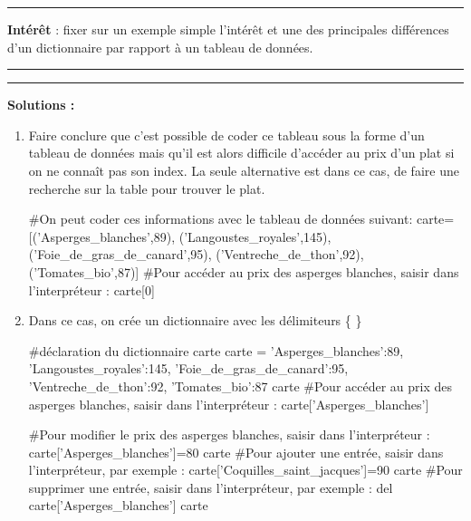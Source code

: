\documentclass[12pt,french]{article}
\begin{document}
\hrule
\vskip0.1cm
\textbf{Intérêt} : fixer sur un exemple simple l'intérêt et une des principales différences d'un dictionnaire par rapport à un tableau de données.\\
\hrule
\vskip0.1cm 
\hrule
\textbf{Solutions :}\\
\begin{enumerate}
	\item Faire conclure que c'est possible de coder ce tableau sous la forme d'un tableau de données mais qu'il est alors difficile d'accéder au prix d'un plat si on ne connaît pas son index. La seule alternative est dans ce cas, de faire une recherche sur la table pour trouver le plat.
\begin{tcolorbox}[enhanced,attach boxed title to top center={yshift=-3mm,yshifttext=-1mm},
	colback=green!5!white,colframe=green!75!black,colbacktitle=green!25!black,
	title=question 1, fonttitle=\bfseries,
	boxed title style={size=small,colframe=green!25!black} ]
\begin{pyconsole}
#On peut coder ces informations avec le tableau de données suivant:	
carte=[('Asperges_blanches',89),
	('Langoustes_royales',145),
	('Foie_de_gras_de_canard',95),
	('Ventreche_de_thon',92),
	('Tomates_bio',87)]
#Pour accéder au prix des asperges blanches, saisir dans l'interpréteur :
carte[0]
\end{pyconsole}
\end{tcolorbox}
\item Dans ce cas, on crée un dictionnaire avec les délimiteurs \{ \}
\begin{tcolorbox}[enhanced,attach boxed title to top center={yshift=-3mm,yshifttext=-1mm},
	colback=green!5!white,colframe=green!75!black,colbacktitle=green!25!black,
	title=questions 2 et 3, fonttitle=\bfseries,
	boxed title style={size=small,colframe=green!25!black} ]
\begin{pyconsole}
#déclaration du dictionnaire carte
carte ={ 'Asperges_blanches':89,
		'Langoustes_royales':145,
		'Foie_de_gras_de_canard':95,
		'Ventreche_de_thon':92,
		'Tomates_bio':87}
carte
#Pour accéder au prix des asperges blanches, saisir dans l'interpréteur :
carte['Asperges_blanches']

#Pour modifier le prix des asperges blanches, saisir dans l'interpréteur :
carte['Asperges_blanches']=80
carte
#Pour ajouter une entrée, saisir dans l'interpréteur, par exemple :
carte['Coquilles_saint_jacques']=90
carte
#Pour supprimer une entrée, saisir dans l'interpréteur, par exemple :
del carte['Asperges_blanches']
carte
\end{pyconsole}

\end{tcolorbox}

\end{enumerate}
\end{document}
